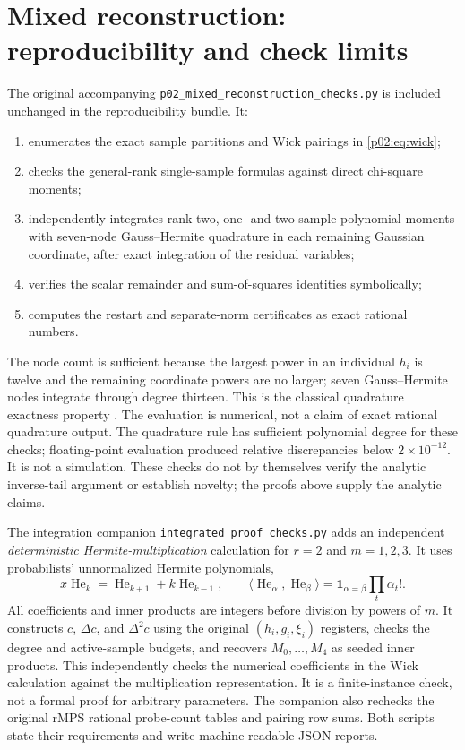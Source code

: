 \documentclass[11pt]{article}
\numberwithin{equation}{section}
\theoremstyle{definition}\newtheorem{definition}[theorem]{Definition}
\theoremstyle{remark}\newtheorem{remark}[theorem]{Remark}
\begin{document}
\clearpage
\section{Mixed reconstruction: reproducibility and check limits}\label{p02:app:checks}
The original accompanying \texttt{p02\_mixed\_reconstruction\_checks.py}
is included unchanged in the reproducibility bundle. It:
\begin{enumerate}[itemsep=2pt]
\item enumerates the exact sample partitions and Wick pairings in \eqref{p02:eq:wick};
\item checks the general-rank single-sample formulas against direct chi-square moments;
\item independently integrates rank-two, one- and two-sample polynomial moments with seven-node Gauss--Hermite quadrature in each remaining Gaussian coordinate, after exact integration of the residual variables;
\item verifies the scalar remainder and sum-of-squares identities symbolically;
\item computes the restart and separate-norm certificates as exact rational numbers.
\end{enumerate}
The node count is sufficient because the largest power in an individual
$h_i$ is twelve and the remaining coordinate powers are no larger; seven
Gauss--Hermite nodes integrate through degree thirteen. This is the classical
quadrature exactness property \cite{GolubWelsch}. The evaluation is numerical,
not a claim of exact rational quadrature output. The quadrature rule has
sufficient polynomial degree for these checks; floating-point evaluation produced relative discrepancies below \(2\times10^{-12}\). It is not a simulation. These checks do not by themselves verify the analytic inverse-tail argument or establish novelty; the proofs above supply the analytic claims.



The integration companion \texttt{integrated\_proof\_checks.py} adds an
independent \emph{deterministic Hermite-multiplication} calculation for $r=2$
and $m=1,2,3$. It uses probabilists' unnormalized Hermite polynomials,
\[
 x\operatorname{He}_k=\operatorname{He}_{k+1}
       +k\operatorname{He}_{k-1},\qquad
 \langle\operatorname{He}_{\alpha},\operatorname{He}_{\beta}\rangle
       =\mathbf1_{\alpha=\beta}\prod_t\alpha_t!.
\]
All coefficients and inner products are integers before division by powers
of $m$. It constructs $c$, $\Delta c$, and $\Delta^2c$ using the original
$(h_i,g_i,\xi_i)$ registers, checks the degree and active-sample budgets, and
recovers $M_0,\ldots,M_4$ as seeded inner products. This independently checks
the numerical coefficients in the Wick calculation against the multiplication
representation. It is a finite-instance check, not a formal proof for arbitrary
parameters. The companion also rechecks the original rMPS rational
probe-count tables and pairing row sums. Both scripts state their requirements
and write machine-readable JSON reports.
\end{document}
